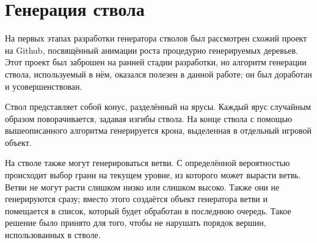 \section{Генерация ствола}
На первых этапах разработки генератора стволов был рассмотрен схожий проект\cite{hassank} на Github, посвящённый анимации роста процедурно генерируемых деревьев. Этот проект был заброшен на ранней стадии разработки, но алгоритм генерации ствола, используемый в нём, оказался полезен в данной работе; он был доработан и усовершенствован.

Ствол представляет собой конус, разделённый на ярусы. Каждый ярус случайным образом поворачивается, задавая изгибы ствола. На конце ствола с помощью вышеописанного алгоритма генерируется крона, выделенная в отдельный игровой объект.

На стволе также могут генерироваться ветви. С определённой вероятностью происходит выбор грани на текущем уровне, из которого может вырасти ветвь. Ветви не могут расти слишком низко или слишком высоко. Также они не генерируются сразу; вместо этого создаётся объект генератора ветви и помещается в список, который будет обработан в последнюю очередь. Такое решение было принято для того, чтобы не нарушать порядок вершин, использованных в стволе. 

